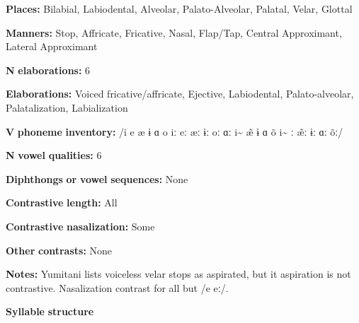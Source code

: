 \documentclass[output=paper]{langsci/langscibook}
\begin{document}
\begin{styleBody}
\textbf{Places:} Bilabial, Labiodental, Alveolar, Palato-Alveolar, Palatal, Velar, Glottal
\end{styleBody}

\begin{styleBody}
\textbf{Manners:} Stop, Affricate, Fricative, Nasal, Flap/Tap, Central Approximant, Lateral Approximant
\end{styleBody}

\begin{styleBody}
\textbf{N} \textbf{elaborations:} 6
\end{styleBody}

\begin{styleBody}
\textbf{Elaborations:} Voiced fricative/affricate, Ejective, Labiodental, Palato-alveolar, Palatalization, Labialization
\end{styleBody}

\begin{styleBody}
\textbf{V} \textbf{phoneme} \textbf{inventory:} /i e æ ɨ ɑ o iː eː æː ɨː oː ɑː i\~{}  \~{æ} ɨ ɑ õ i\~{} ː \~{æ}ː ɨː ɑː õː/
\end{styleBody}

\begin{styleBody}
\textbf{N} \textbf{vowel} \textbf{qualities:} 6
\end{styleBody}

\begin{styleBody}
\textbf{Diphthongs} \textbf{or} \textbf{vowel} \textbf{sequences:} None
\end{styleBody}

\begin{styleBody}
\textbf{Contrastive} \textbf{length:} All
\end{styleBody}

\begin{styleBody}
\textbf{Contrastive} \textbf{nasalization:} Some
\end{styleBody}

\begin{styleBody}
\textbf{Other} \textbf{contrasts:} None
\end{styleBody}

\begin{styleBody}
\textbf{Notes:} Yumitani lists voiceless velar stops as aspirated, but it aspiration is not contrastive. Nasalization contrast for all but /e eː/.
\end{styleBody}

\begin{styleBody}
\textbf{Syllable} \textbf{structure}
\end{styleBody}
\end{document}
